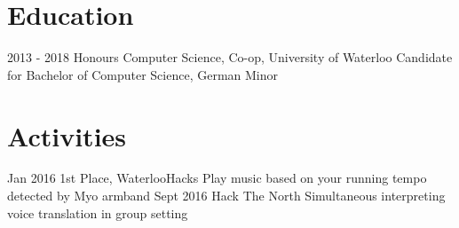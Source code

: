 \documentclass[]{friggeri-cv}
\begin{document}
\section{Education}

\begin{entrylist}
  \entry
    {2013 - 2018}
    {Honours Computer Science, Co-op, University of Waterloo}{}
    {Candidate for Bachelor of Computer Science, German Minor}
\end{entrylist}

\section{Activities}

\begin{entrylist}
  \entry
    {Jan 2016}
    {1st Place, \normalfont WaterlooHacks}{}
    {Play music based on your running tempo detected by Myo armband}
  \entry
    {Sept 2016}
    {\normalfont Hack The North}{}
    {Simultaneous interpreting voice translation in group setting}
\end{entrylist}
\end{document}
